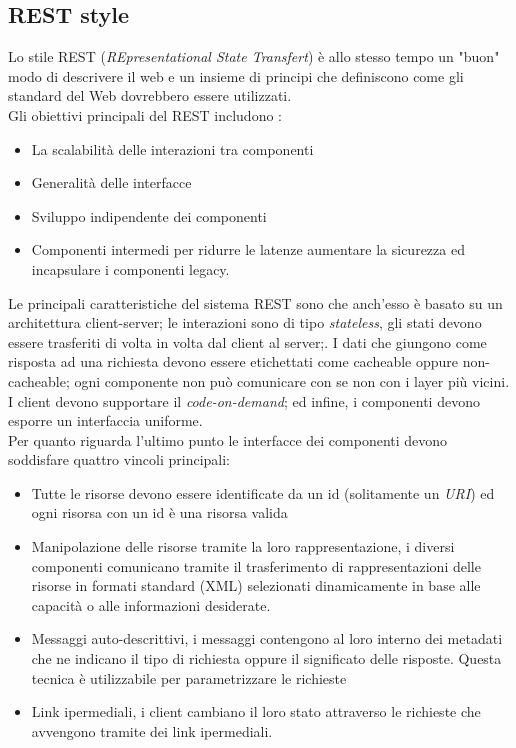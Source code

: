 \subsection{REST style}
Lo stile REST (\emph{REpresentational State Transfert}) è allo stesso tempo un "buon" modo di descrivere il web  e un insieme di principi che definiscono come gli standard del Web dovrebbero essere utilizzati.\\
Gli obiettivi principali del REST includono :
\begin{itemize}
\item La scalabilità delle interazioni tra componenti
\item Generalità delle interfacce
\item Sviluppo indipendente dei componenti
\item Componenti intermedi per ridurre le latenze aumentare la sicurezza ed incapsulare i componenti legacy.
\end{itemize}
Le principali caratteristiche del sistema REST sono che anch'esso è basato su un architettura client-server; le interazioni sono di tipo \emph{stateless}, gli stati devono essere trasferiti di volta in volta dal client al server;.
I dati che giungono come risposta ad una richiesta devono essere etichettati come cacheable oppure non-cacheable; ogni componente non può comunicare con se non con i layer più vicini. I client devono supportare il \emph{code-on-demand}; ed infine, i componenti devono esporre un interfaccia uniforme.\\
Per quanto riguarda l'ultimo punto le interfacce dei componenti devono soddisfare quattro vincoli principali:
\begin{itemize}
\item Tutte le risorse devono essere identificate da un id (solitamente un \emph{URI}) ed ogni risorsa con un id è una risorsa valida
\item Manipolazione delle risorse tramite la loro rappresentazione, i diversi componenti comunicano tramite il trasferimento di rappresentazioni delle risorse in formati standard (XML) selezionati dinamicamente in base alle capacità o alle informazioni desiderate.
\item Messaggi auto-descrittivi, i messaggi contengono al loro interno dei metadati che ne indicano il tipo di richiesta oppure il significato delle risposte. Questa tecnica è utilizzabile per parametrizzare le richieste
\item Link ipermediali, i client cambiano il loro stato attraverso le richieste che avvengono tramite dei link ipermediali.
\end{itemize}
